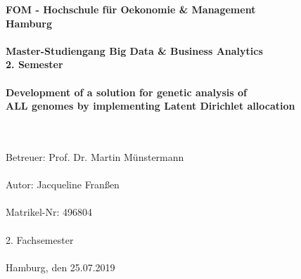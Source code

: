 		\begin{titlepage}
			\begin{center}
			\setlength{\headheight}{1.5\baselineskip}
			\renewcommand{\baselinestretch}{1.5}
					\textbf{\large FOM - Hochschule für Oekonomie \& Management \\
						Hamburg \\
						\ \\
						Master-Studiengang Big Data \& Business Analytics \\
						2. Semester \\
						\ \\
						Development of a solution for genetic analysis of \\
						ALL genomes by implementing Latent Dirichlet allocation\\ 
						\ \\
						}
						
					\textrm{
						\ \\
						Betreuer: Prof. Dr. Martin Münstermann \\
						\ \\
						Autor: Jacqueline Franßen \\
						\ \\
						Matrikel-Nr: 496804 \\
						\ \\
						2. Fachsemester \\
						\ \\
						Hamburg, den 25.07.2019 \\
						}
			\end{center}
		\end{titlepage}

%

			\setcounter{tocdepth}{3}
			\setcounter{secnumdepth}{3}		
			\thispagestyle{empty}
			\tableofcontents
			\newpage
			\listoffigures
			\listoftables

			\thispagestyle{empty}